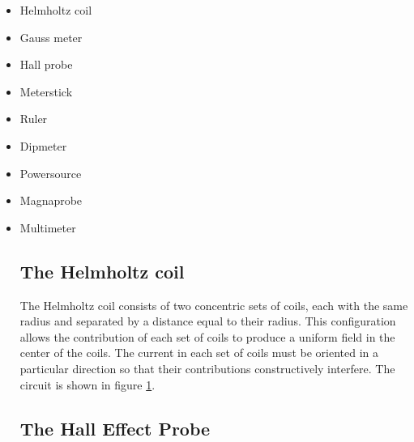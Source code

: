 \documentclass[a4paper]{article}
\begin{document}
\begin{itemize}
\item Helmholtz coil \\
\item Gauss meter \\
\item Hall probe \\
\item Meterstick \\
\item Ruler \\
\item Dipmeter \\
\item Powersource \\
\item Magnaprobe \\
\item Multimeter\\
\bigskip

\subsection{The Helmholtz coil}

The Helmholtz coil consists of two concentric sets of coils, each with
the same radius and separated by a distance equal to their
radius. This configuration allows the contribution of each set of
coils to produce a uniform field in the center of the coils. The
current in each set of coils must be oriented in a particular
direction so that their contributions constructively interfere. The
circuit is shown in figure \ref{helmholtz_circuit}.

\begin{figure}[h]
\centering
\label{helmholtz_circuit}
\end{figure}

\subsection{The Hall Effect Probe}


\end{itemize}
\end{document}

